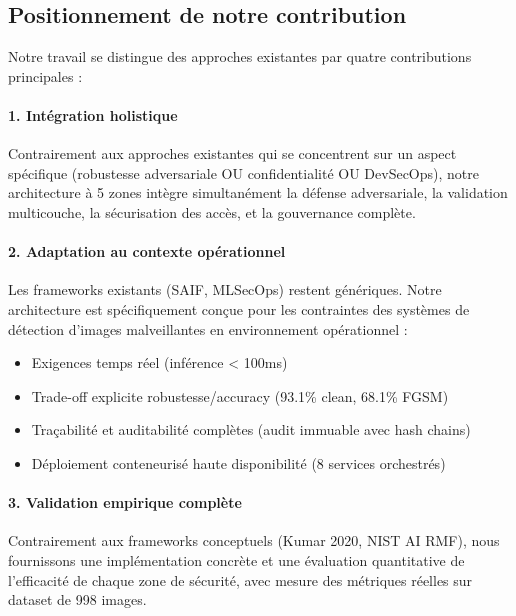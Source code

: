 \subsection{Positionnement de notre contribution}

Notre travail se distingue des approches existantes par quatre contributions principales :

\paragraph{1. Intégration holistique}

Contrairement aux approches existantes qui se concentrent sur un aspect spécifique (robustesse adversariale OU confidentialité OU DevSecOps), notre architecture à 5 zones intègre simultanément la défense adversariale, la validation multicouche, la sécurisation des accès, et la gouvernance complète.

\paragraph{2. Adaptation au contexte opérationnel}

Les frameworks existants (SAIF, MLSecOps) restent génériques. Notre architecture est spécifiquement conçue pour les contraintes des systèmes de détection d'images malveillantes en environnement opérationnel :

\begin{itemize}
    \item Exigences temps réel (inférence < 100ms)
    \item Trade-off explicite robustesse/accuracy (93.1\% clean, 68.1\% FGSM)
    \item Traçabilité et auditabilité complètes (audit immuable avec hash chains)
    \item Déploiement conteneurisé haute disponibilité (8 services orchestrés)
\end{itemize}

\paragraph{3. Validation empirique complète}

Contrairement aux frameworks conceptuels (Kumar 2020, NIST AI RMF), nous fournissons une implémentation concrète et une évaluation quantitative de l'efficacité de chaque zone de sécurité, avec mesure des métriques réelles sur dataset de 998 images.

